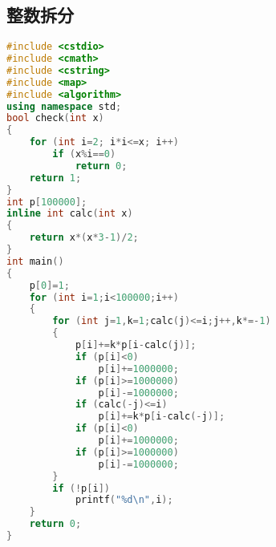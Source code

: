 \subsection{整数拆分}
	\begin{lstlisting}[language=c++]
#include <cstdio>
#include <cmath>
#include <cstring>
#include <map>
#include <algorithm>
using namespace std;
bool check(int x)
{
	for (int i=2; i*i<=x; i++)
		if (x%i==0)
			return 0;
	return 1;
}
int p[100000];
inline int calc(int x)
{
	return x*(x*3-1)/2;
}
int main()
{
	p[0]=1;
	for (int i=1;i<100000;i++)
	{
		for (int j=1,k=1;calc(j)<=i;j++,k*=-1)
		{
			p[i]+=k*p[i-calc(j)];
			if (p[i]<0)
				p[i]+=1000000;
			if (p[i]>=1000000)
				p[i]-=1000000;
			if (calc(-j)<=i)
				p[i]+=k*p[i-calc(-j)];
			if (p[i]<0)
				p[i]+=1000000;
			if (p[i]>=1000000)
				p[i]-=1000000;
		}
		if (!p[i])
			printf("%d\n",i);
	}
	return 0;
}
	\end{lstlisting}
